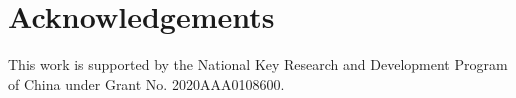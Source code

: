 \documentclass[11pt]{article}
\begin{document}


\section*{Acknowledgements}
This work is supported by the National Key Research and Development Program of China under Grant No. 2020AAA0108600.



%




\end{document}
